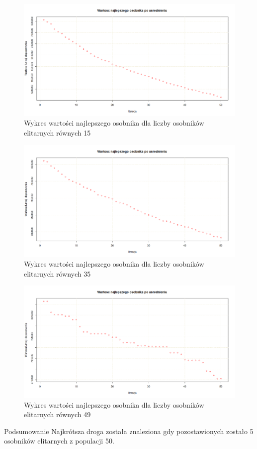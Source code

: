 \documentclass{article}
\begin{document}
\begin{figure}[H]
\centering

\includegraphics[scale=0.3]{IO_obrazy/brg180_elit_15}
\caption{Wykres wartości najlepszego osobnika dla liczby osobników elitarnych równych 15}
\end{figure}

\begin{figure}[H]
\centering

\includegraphics[scale=0.3]{IO_obrazy/brg180_elit_35}
\caption{Wykres wartości najlepszego osobnika dla liczby osobników elitarnych równych 35}
\end{figure}


\begin{figure}[H]
\centering

\includegraphics[scale=0.3]{IO_obrazy/brg180_elit_49}
\caption{Wykres wartości najlepszego osobnika dla liczby osobników elitarnych równych 49}
\end{figure}


Podsumowanie Najkrótsza droga została znaleziona gdy pozostawionych zostało 5 osobników elitarnych z populacji 50. 
\end{document}
